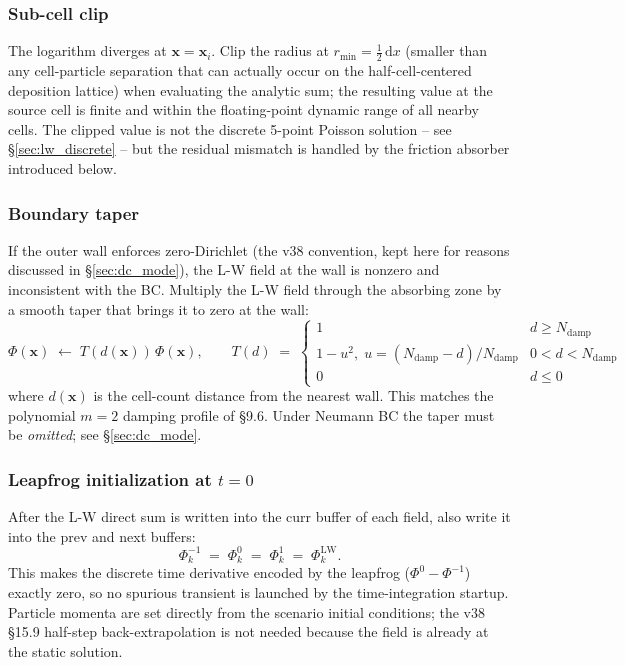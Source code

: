 \documentclass[11pt,a4paper]{article}
\newcommand{\vv}[1]{\mathbf{#1}}
\newcommand{\dd}{\mathrm{d}}
\newcommand{\half}{\tfrac{1}{2}}
\begin{document}
\subsubsection*{Sub-cell clip}

The logarithm diverges at $\vv{x} = \vv{x}_i$.  Clip the radius at
$r_{\min} = \half\,\dd x$ (smaller than any cell-particle separation
that can actually occur on the half-cell-centered deposition lattice)
when evaluating the analytic sum; the resulting value at the source
cell is finite and within the floating-point dynamic range of all
nearby cells.  The clipped value is not the discrete 5-point Poisson
solution -- see \S\ref{sec:lw_discrete} -- but the residual mismatch is
handled by the friction absorber introduced below.

\subsubsection*{Boundary taper}

If the outer wall enforces zero-Dirichlet (the v38 convention, kept
here for reasons discussed in \S\ref{sec:dc_mode}), the L-W field at
the wall is nonzero and inconsistent with the BC.  Multiply the L-W
field through the absorbing zone by a smooth taper that brings it to
zero at the wall:
\begin{equation}
  \Phi(\vv{x}) \;\leftarrow\; T(d(\vv{x}))\,\Phi(\vv{x}),
  \qquad
  T(d) \;=\;
  \begin{cases}
    1 & d \ge N_\text{damp} \\
    1 - u^2,\; u = (N_\text{damp} - d)/N_\text{damp} & 0 < d < N_\text{damp} \\
    0 & d \le 0
  \end{cases}
\end{equation}
where $d(\vv{x})$ is the cell-count distance from the nearest wall.
This matches the polynomial $m=2$ damping profile of \S 9.6.  Under
Neumann BC the taper must be \emph{omitted}; see \S\ref{sec:dc_mode}.

\subsubsection*{Leapfrog initialization at $t=0$}

After the L-W direct sum is written into the curr buffer of each
field, also write it into the prev and next buffers:
\begin{equation}
  \Phi^{-1}_k \;=\; \Phi^{0}_k \;=\; \Phi^{1}_k \;=\; \Phi^\text{LW}_k.
\end{equation}
This makes the discrete time derivative encoded by the leapfrog
($\Phi^0 - \Phi^{-1}$) exactly zero, so no spurious transient is
launched by the time-integration startup.  Particle momenta are set
directly from the scenario initial conditions; the v38 \S 15.9
half-step back-extrapolation is not needed because the field is
already at the static solution.
\end{document}
